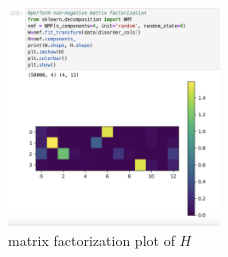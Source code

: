 \documentclass[11pt]{amsart}
\begin{document}
\begin{figure}[h]
\caption{matrix factorization plot of $H$}
\centering
\includegraphics[width=0.5\textwidth]{matrix_factorization.png}
\end{figure}
\end{document}
